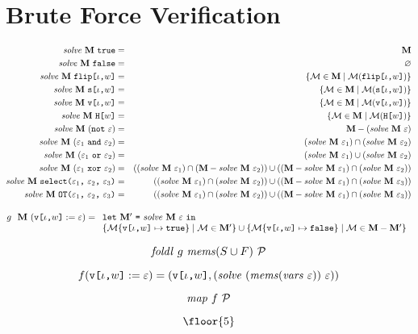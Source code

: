 \section{Brute Force Verification}
\label{section-bruteforce}

\begin{eqnarray*}
\solve{\stores}{\etrue} &=& \stores\\
\solve{\stores}{\efalse} &=& \varnothing\\
\solve{\stores}{\flip{\cid}{w}} &=& \{ \store \in \stores \mid \store(\flip{\cid}{w}) \} \\
\solve{\stores}{\secret{\cid}{w}} &=& \{ \store \in \stores \mid \store(\secret{\cid}{w}) \} \\
\solve{\stores}{\view{\cid}{w}} &=& \{ \store \in \stores \mid \store(\view{\cid}{w}) \} \\
\solve{\stores}{\oracle{w}} &=& \{ \store \in \stores \mid \store(\oracle{w}) \} \\
\solve{\stores}{(\enot\ \be)} &=& \stores - (\solve{\stores}{\be})\\
\solve{\stores}{(\be_1\ \eand\ \be_2)} &=& (\solve{\stores}{\be_1}) \cap (\solve{\stores}{\be_2}) \\
\solve{\stores}{(\be_1\ \eor\ \be_2)} &=& (\solve{\stores}{\be_1}) \cup (\solve{\stores}{\be_2}) \\
\solve{\stores}{(\be_1\ \exor\ \be_2)} &=&
 ((\solve{\stores}{\be_1}) \cap (\stores - \solve{\stores}{\be_2})) \cup
 ((\stores - \solve{\stores}{\be_1}) \cap (\solve{\stores}{\be_2})) \\
\solve{\stores}{\select{\be_1}{\be_2}{\be_3}} &=&
 ((\solve{\stores}{\be_1}) \cap (\solve{\stores}{\be_2})) \cup
 ((\stores - \solve{\stores}{\be_1}) \cap (\solve{\stores}{\be_3})) \\
\solve{\stores}{\OT{\be_1}{\be_2}{\be_3}} &=&
 ((\solve{\stores}{\be_1}) \cap (\solve{\stores}{\be_2})) \cup
 ((\stores - \solve{\stores}{\be_1}) \cap (\solve{\stores}{\be_3}))
\end{eqnarray*}


$$
g\ \ \stores\ (\eassign{\view{\cid}{w}}{\be}) =\begin{array}[t]{l}
\elet{\stores'}{\solve{\stores}{\be}}{}\\
  \{\extend{\store}{\view{\cid}{w}}{\etrue} \mid \store \in \stores' \} \cup
  \{\extend{\store}{\view{\cid}{w}}{\efalse} \mid \store \in \stores - \stores' \}\end{array}
$$

$$
\mathit{foldl}\ g\ \mems(S \cup F)\ \prog
$$

$$
f(\eassign{\view{\cid}{w}}{\be}) = (\view{\cid}{w}, (\solve{(\mems(\vars\ \be))}{\be}))
$$

$$
\mathit{map}\ f\ \prog
$$

$$
\floor{5}
$$
